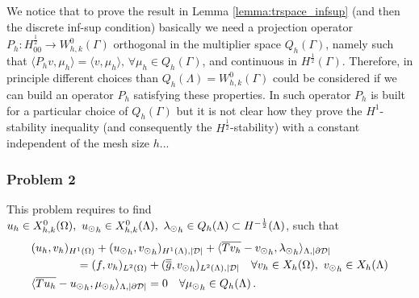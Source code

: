 {\color{red}
\begin{remark} We notice that to prove the result in Lemma \ref{lemma:trspace_infsup} (and then the discrete inf-sup condition)  basically we need a projection operator $P_h: H^{\frac 12}_{00} \longrightarrow W_{h,k}^0(\Gamma)$ orthogonal in the multiplier space $Q_h(\Gamma)$, namely such that $\langle P_h v, \mu_h \rangle = \langle v, \mu_h \rangle, \, \forall \mu_h \in Q_h(\Gamma)$, and continuous in $H^{\frac 12}(\Gamma)$. Therefore, in principle different choices than $Q_h(\Lambda)=W_{h,k}^0(\Gamma)$ could be considered if we can build an operator $P_h$ satisfying these properties. In \cite{belgacem1999mortar} such operator $P_h$  is built for a particular choice of $Q_h(\Gamma)$ but it is not clear how they prove the $H^1$-stability inequality (and consequently the $H^{\frac 12 }$-stability) with a constant independent of the mesh size $h$...
\end{remark}  
}
\subsubsection{Problem 2}
This problem requires to find  $u_h \in X^0_{h,k}(\Omega) ,\ {u_{\odot}}_h \in X^0_{h,k}(\Lambda), \ {\lambda_{\odot}}_h \in Q_h(\Lambda) \subset H^{-\frac12}(\Lambda)$, such that
\begin{subequations}
\begin{align}\label{eq:prob2_discrete}
&(u_h,v_h)_{H^1(\Omega)} + ({\ud}_h,{\vd}_h)_{H^1(\Lambda), |{\cal D}|} 
+  \langle  \avrc{Tv_h} -  {\vd}_h, {\ld}_h \rangle_{\Lambda, |\DD|} 
\\
\nonumber
&\qquad\qquad= (f,v_h)_{L^2(\Omega)} + (\avrd{g},{\vd}_h)_{L^2(\Lambda), |{\cal D}|}
\quad \forall v_h \in X_h(\Omega), \ {\vd}_h \in X_h(\Lambda)
\\
&  \langle \avrc{T u_h} - {\ud}_h, {\md}_h \rangle_{\Lambda,| \DD| } = 0
\quad \forall {\md}_h \in Q_h(\Lambda)\,.
\end{align}
\end{subequations}

